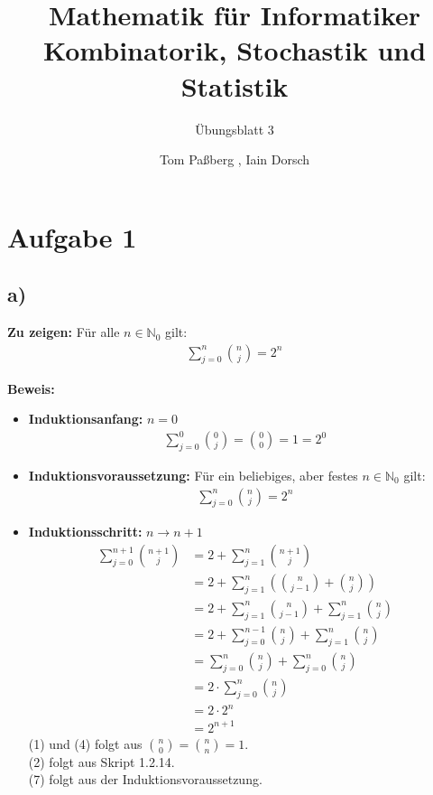 \documentclass[a4paper]{scrartcl}
\title{Mathematik für Informatiker \\ Kombinatorik, Stochastik und Statistik}
\subtitle{Übungsblatt 3}
\author{Tom Paßberg , Iain Dorsch}
\date{}
\begin{document}
\maketitle

\newpage
\section*{Aufgabe 1}
\subsection*{a)}
\textbf{Zu zeigen:} Für alle $ n \in \mathbb{N}_0$ gilt: 
\begin{align*}
    \sum_{j=0}^{n} \binom{n}{j} = 2^n
\end{align*}

\textbf{Beweis:} 
\begin{itemize}
    \item \textbf{Induktionsanfang:} $n = 0$
    \begin{align*}
        \sum_{j=0}^{0} \binom{0}{j} = \binom{0}{0} = 1 = 2^0
    \end{align*}
    \item \textbf{Induktionsvoraussetzung:} Für ein beliebiges, aber festes $n \in \mathbb{N}_0$ gilt:
    \begin{align*}
        \sum_{j=0}^{n} \binom{n}{j} = 2^n
    \end{align*}
    \item \textbf{Induktionsschritt:} $n \to n+1$
    \begin{align}
        \sum_{j=0}^{n+1} \binom{n+1}{j} &= 2 + \sum_{j=1}^{n} \binom{n+1}{j} \\ 
        &= 2 + \sum_{j=1}^{n} \left( \binom{n}{j-1} + \binom{n}{j} \right) \\
        &= 2 + \sum_{j=1}^{n} \binom{n}{j-1} + \sum_{j=1}^{n}\binom{n}{j} \\
        &= 2 + \sum_{j=0}^{n-1} \binom{n}{j} + \sum_{j=1}^{n} \binom{n}{j} \\
        &= \sum_{j=0}^{n} \binom{n}{j} + \sum_{j=0}^{n} \binom{n}{j} \\
        &= 2 \cdot \sum_{j=0}^{n} \binom{n}{j} \\
        &= 2 \cdot 2^n \\[8px]
        &= 2^{n+1}
    \end{align}
    (1) und (4) folgt aus $ \binom{n}{0} = \binom{n}{n} = 1$. \\
    (2) folgt aus Skript 1.2.14. \\
    (7) folgt aus der Induktionsvoraussetzung. 
\end{itemize}
\end{document}
